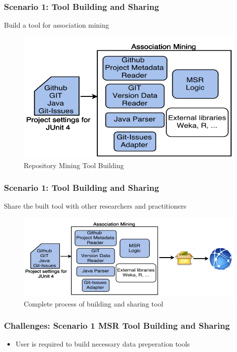         \begin{frame}
            \frametitle{Scenario 1: Tool Building and Sharing}
            Build a tool for association mining
            \begin{figure}
                \centering
                \includegraphics[width=0.60\linewidth]{figures/association.png}
                \caption{Repository Mining Tool Building}
            \end{figure}
        \end{frame}

        \begin{frame}
            \frametitle{Scenario 1: Tool Building and Sharing}
            Share the built tool with other researchers and practitioners
            \begin{figure}
                \centering
                \includegraphics[width=0.85\linewidth]{figures/junitsharing.jpg}
                \caption{Complete process of building and sharing tool}
            \end{figure}
        \end{frame}

        \begin{frame}
            \frametitle{Challenges: Scenario 1 MSR Tool Building and Sharing}
             \begin{itemize}
                \item User is required to build necessary data preperation tools
             \end{itemize}
        \end{frame}

